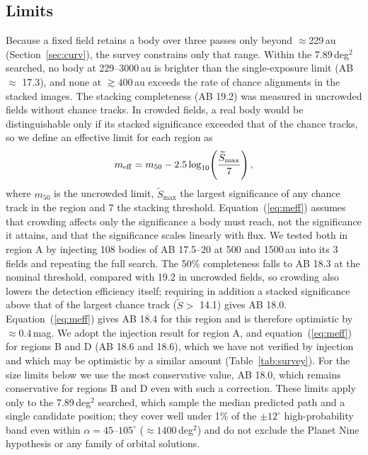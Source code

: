 \documentclass[twocolumn,linenumbers]{aastex702}
\begin{document}
\subsection{Limits}\label{sec:limits}
Because a fixed field retains a body over three passes only beyond $\approx$229\,au (Section~\ref{sec:curv}), the survey constrains only that range. Within the 7.89\,deg$^2$ searched, no body at 229--3000\,au is brighter than the single-exposure limit (AB $\approx$ 17.3), and none at $\gtrsim 400$\,au exceeds the rate of chance alignments in the stacked images. The stacking completeness (AB 19.2) was measured in uncrowded fields without chance tracks. In crowded fields, a real body would be distinguishable only if its stacked significance exceeded that of the chance tracks, so we define an effective limit for each region as
\begin{equation}
m_{\rm eff} = m_{50} - 2.5\log_{10}\!\left(\frac{\widetilde{S}_{\max}}{7}\right),
\label{eq:meff}
\end{equation}
where $m_{50}$ is the uncrowded limit, $\widetilde{S}_{\max}$ the largest significance of any chance track in the region and 7 the stacking threshold. Equation~(\ref{eq:meff}) assumes that crowding affects only the significance a body must reach, not the significance it attains, and that the significance scales linearly with flux. We tested both in region A by injecting 108 bodies of AB 17.5--20 at 500 and 1500\,au into its 3 fields and repeating the full search. The 50\% completeness falls to AB 18.3 at the nominal threshold, compared with 19.2 in uncrowded fields, so crowding also lowers the detection efficiency itself; requiring in addition a stacked significance above that of the largest chance track ($\widetilde{S} > $ 14.1) gives AB 18.0. Equation~(\ref{eq:meff}) gives AB 18.4 for this region and is therefore optimistic by $\approx 0.4$\,mag. We adopt the injection result for region A, and equation~(\ref{eq:meff}) for regions B and D (AB 18.6 and 18.6), which we have not verified by injection and which may be optimistic by a similar amount (Table~\ref{tab:survey}). For the size limits below we use the most conservative value, AB 18.0, which remains conservative for regions B and D even with such a correction. These limits apply only to the 7.89\,deg$^2$ searched, which sample the median predicted path and a single candidate position; they cover well under 1\% of the $\pm 12^\circ$ high-probability band even within $\alpha = 45$--$105^\circ$ ($\approx 1400$\,deg$^2$) and do not exclude the Planet Nine hypothesis or any family of orbital solutions.
\end{document}
